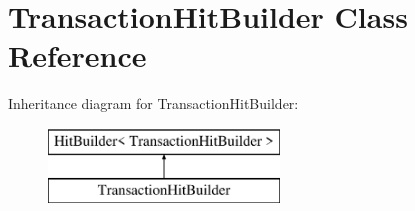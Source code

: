 \hypertarget{class_transaction_hit_builder}{}\section{Transaction\+Hit\+Builder Class Reference}
\label{class_transaction_hit_builder}
Inheritance diagram for Transaction\+Hit\+Builder\+:\begin{figure}[H]
\begin{center}
\leavevmode
\includegraphics[height=2.000000cm]{class_transaction_hit_builder}
\end{center}
\end{figure}
